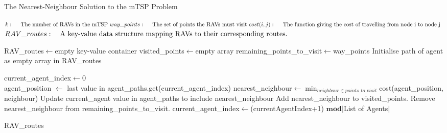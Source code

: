 \begin{algorithm}[h]
\caption{The Nearest-Neighbour Solution to the mTSP Problem}
\label{alg:NNHeuristic}
\begin{algorithmic}[1]
\renewcommand{\algorithmicrequire}{\textbf{Input:}}
\renewcommand{\algorithmicensure}{\textbf{Output:}}

\REQUIRE$ \newline k: \quad \text{ The number of RAVs in the mTSP }
\newline way\_points: \quad \text{ The set of points the RAVs must visit }
\newline cost(i,j): \quad \text{ The function giving the cost of travelling from node i to node j }
$
\ENSURE $ \newline RAV\_routes: \quad \text{A key-value data structure mapping RAVs to their corresponding routes.}
$

\hfill\pagebreak

\STATE RAV\_routes$\leftarrow$empty key-value container
\STATE visited\_points$\leftarrow$empty array
\STATE remaining\_points\_to\_visit$\leftarrow$way\_points
\STATE Initialise path of agent as empty array in RAV\_routes
\ENDFOR

current\_agent\_index$\leftarrow$0\\
\hfill\pagebreak
{}
\STATE agent\_position $\leftarrow$ last value in agent\_paths.get(current\_agent\_index)
\STATE nearest\_neighbour$\leftarrow$\(\displaystyle \min_{neighbour \in points\_to\_visit}\)cost(agent\_position, neighbour)
\STATE Update current\_agent value in agent\_paths to include nearest\_neighbour
\STATE Add nearest\_neighbour to visited\_points.
\STATE Remove nearest\_neighbour from remaining\_points\_to\_visit.
\STATE current\_agent\_index$\leftarrow$(currentAgentIndex+1) $\mathbf{mod}$$\vert$List of Agents$\vert$



\ENDWHILE
\RETURN RAV\_routes
\end{algorithmic} 
\end{algorithm}

